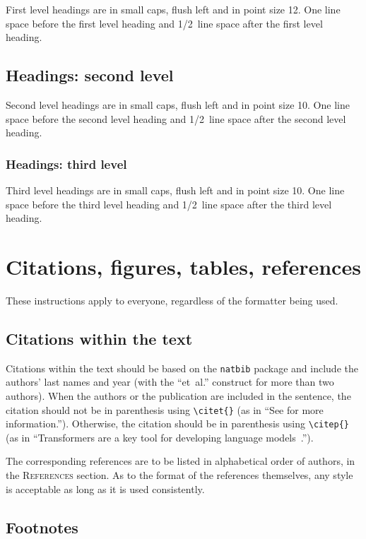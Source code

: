 \documentclass{article} %
\begin{document}
First level headings are in small caps,
flush left and in point size 12. One line space before the first level
heading and 1/2~line space after the first level heading.

\subsection{Headings: second level}

Second level headings are in small caps,
flush left and in point size 10. One line space before the second level
heading and 1/2~line space after the second level heading.

\subsubsection{Headings: third level}

Third level headings are in small caps,
flush left and in point size 10. One line space before the third level
heading and 1/2~line space after the third level heading.

\section{Citations, figures, tables, references}
\label{others}

These instructions apply to everyone, regardless of the formatter being used.

\subsection{Citations within the text}

Citations within the text should be based on the \texttt{natbib} package
and include the authors' last names and year (with the ``et~al.'' construct
for more than two authors). When the authors or the publication are
included in the sentence, the citation should not be in parenthesis using \verb|\citet{}| (as
in ``See \citet{Vaswani+2017} for more information.''). Otherwise, the citation
should be in parenthesis using \verb|\citep{}| (as in ``Transformers are a key tool
for developing language models~\citep{Vaswani+2017}.'').

The corresponding references are to be listed in alphabetical order of
authors, in the \textsc{References} section. As to the format of the
references themselves, any style is acceptable as long as it is used
consistently.

\subsection{Footnotes}
\end{document}
